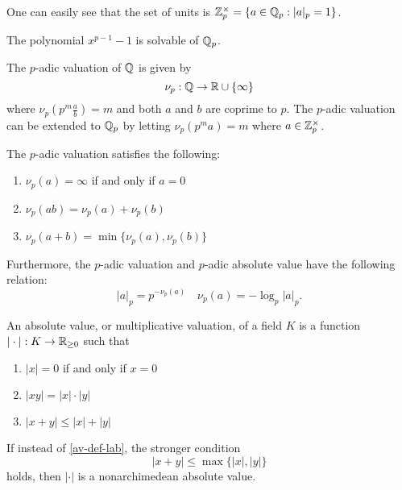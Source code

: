 One can easily see that the set of units is $\mathbb{Z}_p^\times = \{a \in \mathbb{Q}_p: |a|_p =1 \}$.

\begin{example}
    The polynomial $x^{p-1} -1$ is solvable of $\mathbb{Q}_p$.
\end{example}

\begin{definition}
    The $p$-adic valuation of $\mathbb{Q}$ is given by
        \[\nu_p: \mathbb{Q} \to \mathbb{R} \cup \{\infty\} \]
    where $\nu_p(p^m\frac{a}{b}) = m$ and both $a$ and $b$ are coprime to $p$. The $p$-adic valuation can be extended to $\mathbb{Q}_p$ by letting $\nu_p(p^m a) = m$ where $a \in \mathbb{Z}_p^\times$. 
\end{definition}

\begin{proposition}
    The $p$-adic valuation satisfies the following:

    \begin{enumerate}
        \item $\nu_p(a) = \infty$ if and only if $a = 0$
        \item $\nu_p(ab) = \nu_p(a) + \nu_p(b)$
        \item $\nu_p(a+b) = \min\{\nu_p(a), \nu_p(b)\}$
    \end{enumerate}
    
    Furthermore, the $p$-adic valuation and $p$-adic absolute value have the following relation:
    \[|a|_p = p^{-\nu_p(a)} \quad \nu_p(a) = -\log_p|a|_p.\]
\end{proposition}

\begin{definition}
    An absolute value, or multiplicative valuation, of a field $K$ is a function $|\cdot|: K \to \mathbb{R}_{\geq 0}$ such that

    \begin{enumerate}[(1)]
        \item $|x| = 0$ if and only if $x = 0$
        \item $|xy| = |x|\cdot |y|$
        \item $|x+y| \leq |x| + |y|$ \label{av-def-lab}
    \end{enumerate}

    If instead of \ref{av-def-lab}, the stronger condition
        \[|x+y| \leq \max\{|x|, |y|\}\]
    holds, then $|\cdot|$ is a nonarchimedean absolute value.
\end{definition}

